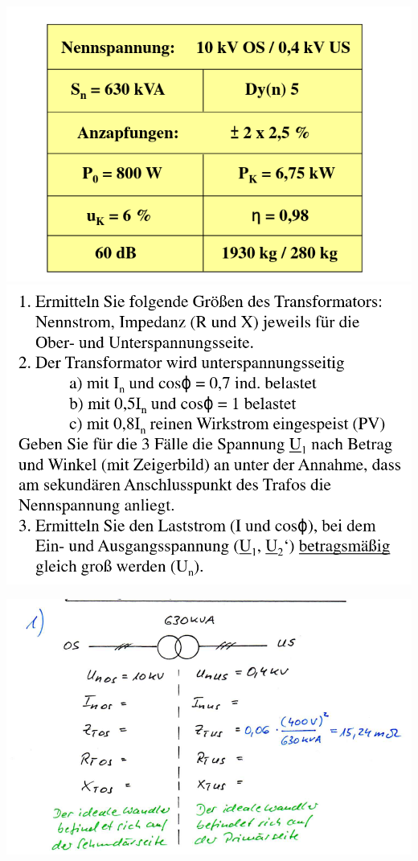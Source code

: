 \documentclass[a4paper]{article}
\begin{document}
\includegraphics[width=\textwidth]{uebung.png}
\includegraphics[width=\textwidth]{aufgaben.png}

\includegraphics[width=\textwidth]{uebtab.png}
\end{document}
